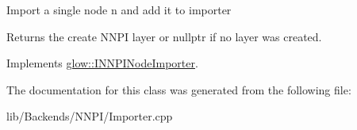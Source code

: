 Import a single node {\ttfamily n} and add it to {\ttfamily importer} \begin{DoxyReturn}{Returns}
the create N\+N\+PI layer or nullptr if no layer was created. 
\end{DoxyReturn}


Implements \hyperlink{classglow_1_1_i_n_n_p_i_node_importer_aa861e10cb0c17a92abb94bf613b57807}{glow\+::\+I\+N\+N\+P\+I\+Node\+Importer}.



The documentation for this class was generated from the following file\+:\begin{DoxyCompactItemize}
\item 
lib/\+Backends/\+N\+N\+P\+I/Importer.\+cpp\end{DoxyCompactItemize}

